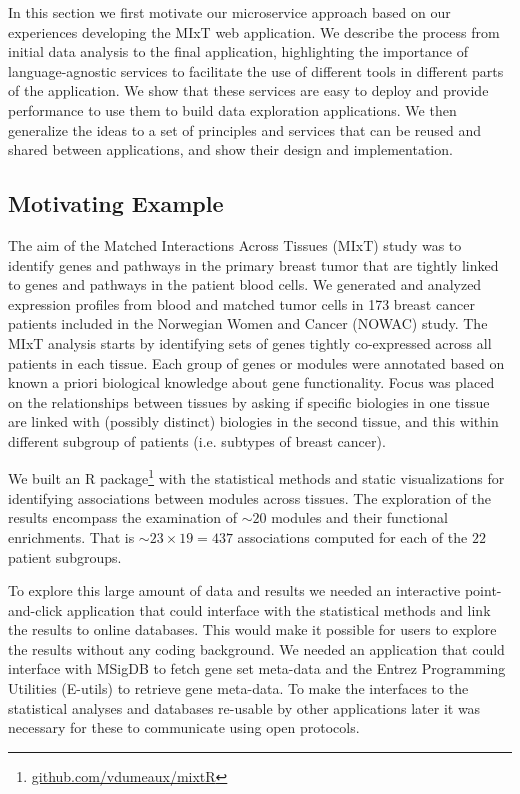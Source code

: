 In this section we first motivate our microservice approach based on our
experiences developing the MIxT web application. We describe the process from
initial data analysis to the final application, highlighting the importance of
language-agnostic services to facilitate the use of different tools in different
parts of the application. We show that these services are easy to deploy and
provide performance to use them to build data exploration applications.
We then generalize the ideas to a set of principles and services that can be
reused and shared between applications, and show their design and
implementation. 

\subsection*{Motivating Example} 
The aim of the Matched Interactions Across Tissues (MIxT) study was to identify
genes and pathways in the primary breast tumor that are tightly linked to genes
and pathways in the patient blood cells. We generated and analyzed expression
profiles from blood and matched tumor cells in 173 breast cancer patients
included in the Norwegian Women and Cancer (NOWAC) study.\cite{vanessa}
The MIxT analysis starts by identifying sets of genes tightly co-expressed
across all patients in each tissue. Each group of genes or modules were
annotated based on known a priori biological knowledge about gene functionality.
Focus was placed on the relationships between tissues by asking if specific
biologies in one tissue are linked with (possibly distinct) biologies in the
second tissue, and this within different subgroup of patients (i.e. subtypes of
breast cancer).

We built an R package\footnote{\url{github.com/vdumeaux/mixtR}} with the
statistical methods and static visualizations for identifying associations
between modules across tissues. The exploration of the results encompass the
examination  of $\sim20$ modules and their functional enrichments. That is
$\sim23\times19=437$ associations computed for each of the $22$ patient
subgroups. 

To explore this large amount of data and results we needed an interactive
point-and-click application that could interface with the statistical methods
and link the results to online databases. This would make it possible for users
to explore the results without any coding background. We needed an application
that could interface with MSigDB to fetch gene set meta-data and the Entrez
Programming Utilities (E-utils) to retrieve gene meta-data. To make the
interfaces to the statistical analyses and databases re-usable by other
applications later it was necessary for these to communicate using open
protocols. 

